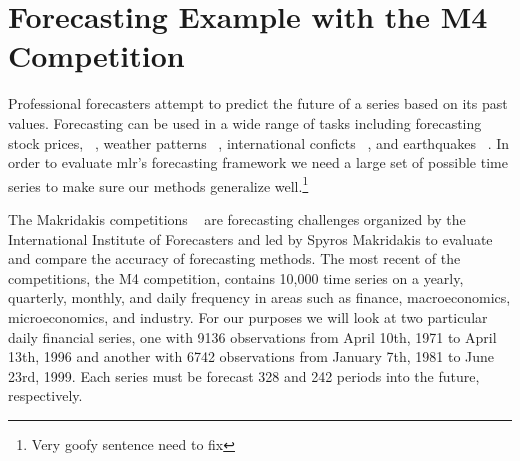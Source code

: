 \documentclass{article}\usepackage[]{graphicx}\usepackage[]{color}
\theoremstyle{definition}
\newcommand{\pkg}[1]{{\fontseries{b}\selectfont #1}}
\begin{document}
\section{Forecasting Example with the M4 Competition}
\label{sec:m4data}

Professional forecasters attempt to predict the future of a series based on its past values. Forecasting can be used in a wide range of tasks including forecasting stock prices, ~\cite{GRANGER19923}, weather patterns ~\cite{MurphymeteoForecast}, international conficts ~\cite{Chadefaux01012014}, and earthquakes ~\cite{earthquakeYegu}. In order to evaluate \pkg{mlr}'s forecasting framework we need a large set of possible time series to make sure our methods generalize well.\footnote{Very goofy sentence need to fix}

The Makridakis competitions ~\cite{Makridakis2000451} are forecasting challenges organized by the International Institute of Forecasters and led by Spyros Makridakis to evaluate and compare the accuracy of forecasting methods. The most recent of the competitions, the M4 competition, contains 10,000 time series on a yearly, quarterly, monthly, and daily frequency in areas such as finance, macroeconomics, microeconomics, and industry. For our purposes we will look at two particular daily financial series, one with 9136 observations from April 10th, 1971 to April 13th, 1996 and another with 6742 observations from January 7th, 1981 to June 23rd, 1999. Each series must be forecast 328 and 242 periods into the future, respectively.
\end{document}
